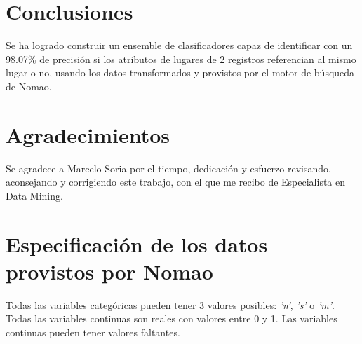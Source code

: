 \documentclass[journal]{IEEEtran}
\begin{document}
\section{Conclusiones}
Se ha logrado construir un ensemble de clasificadores capaz de identificar
con un 98.07\% de precisión si los atributos de lugares de 2 registros
referencian al mismo lugar o no,
usando los datos transformados y provistos por el motor de búsqueda de Nomao.

\section*{Agradecimientos}
Se agradece a Marcelo Soria por el tiempo, dedicación y esfuerzo 
revisando, aconsejando y corrigiendo este trabajo, 
con el que me recibo de Especialista
en Data Mining.


\appendices

\section{Especificación de los datos provistos por Nomao}
\label{appendix1}
Todas las variables categóricas pueden tener 3 valores posibles:
\textit{'n'}, \textit{'s'} o \textit{'m'}.
Todas las variables continuas son reales con valores entre 
0 y 1. Las variables continuas pueden tener valores faltantes.
\end{document}
